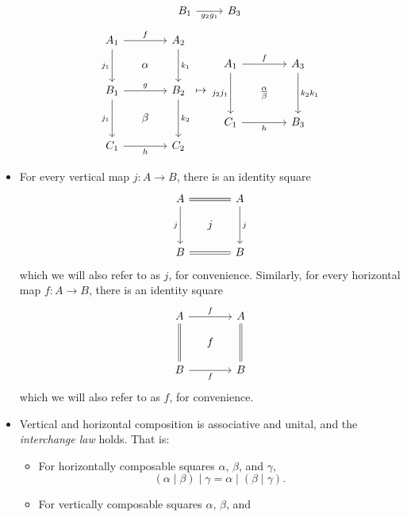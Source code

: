 \documentclass[DynamicalBook]{subfiles}
\begin{document}
\begin{definition}
\begin{itemize}
\[\begin{tikzcd}[sep=small]
          B_1 \ar[rr, "g_2 g_1"'] & & B_3
        \end{tikzcd}
        \]
        \[
        \begin{tikzcd}[sep=small]
          A_1 \ar[dd, "j_1"'] \ar[rr, "f"] & & A_2 \ar[dd, "k_1"]  \\
           & \alpha &  \\
           B_1 \ar[dd, "j_1"'] \ar[rr, "g"] & & B_2 \ar[dd, "k_2"]\\
           & \beta & \\
           C_1 \ar[rr, "h"']& & C_2
        \end{tikzcd} \mapsto
        \begin{tikzcd}[sep=small]
          A_1 \ar[dd, "j_2 j_1"'] \ar[rr, "f"] & & A_3 \ar[dd, "k_2 k_1"] \\
           & \frac{\alpha}{\beta} & \\
          C_1 \ar[rr, "h"'] & & B_3
        \end{tikzcd}
        \]
      \item For every vertical map $j : A \to B$, there is an identity square
        \[
        \begin{tikzcd}[sep=small]
          A \ar[dd, "j"'] \ar[rr, equals] & & A \ar[dd, "j"] \\
           & j & \\
          B \ar[rr, equals] & & B
        \end{tikzcd}
        \]
        which we will also refer to as $j$, for convenience. Similarly, for
        every horizontal map $f : A \to B$, there is an identity square
        \[
        \begin{tikzcd}[sep=small]
          A \ar[rr, "f"] \ar[dd, equals] & & A \ar[dd, equals] \\
           & f & \\
          B \ar[rr, "f"'] & & B
        \end{tikzcd}
        \]
        which we will also refer to as $f$, for convenience.
      \item Vertical and horizontal composition is associative and unital, and
        the \emph{interchange law} holds. That is:
        \begin{itemize}
          \item For horizontally composable squares $\alpha$, $\beta$, and
            $\gamma$, $$(\alpha \mid \beta) \mid \gamma = \alpha \mid (\beta \mid
            \gamma).$$
          \item For vertically composable squares $\alpha$, $\beta$, and

\end{itemize}
\end{itemize}
\end{definition}
\end{document}
